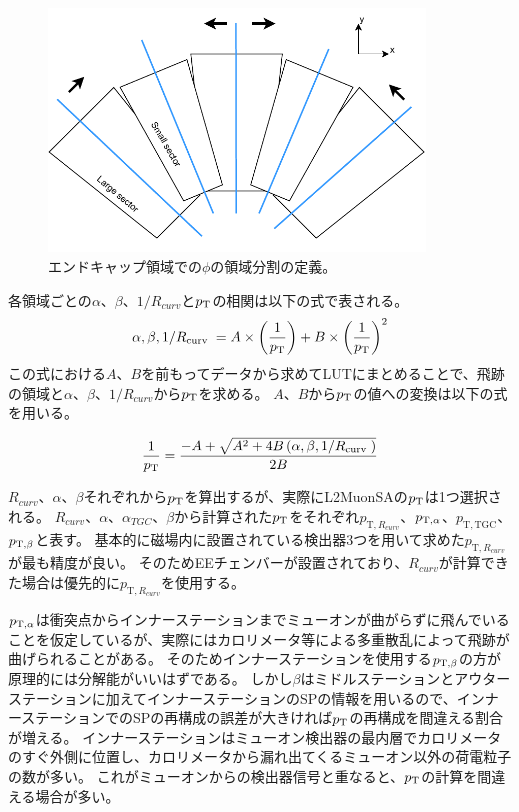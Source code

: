 \begin{figure}[h]
  \centering
  \includegraphics[clip, width=10cm]{fig/3/LUT_binning.pdf}
  \caption{エンドキャップ領域での$\phi$の領域分割の定義。}
  \label{fig:3-10}
\end{figure}

各領域ごとの$\alpha$、$\beta$、$1/R_{curv}$と$p_\mathrm{T}$の相関は以下の式で表される。
\begin{equation}
    \alpha, \beta, 1 / R_{\text {curv }}=A \times\left(\frac{1}{p_\mathrm{T}}\right)+B \times\left(\frac{1}{p_\mathrm{T}}\right)^2
\end{equation}
この式における$A$、$B$を前もってデータから求めてLUTにまとめることで、飛跡の領域と$\alpha$、$\beta$、$1/R_{curv}$から$p_\mathrm{T}$を求める。
$A$、$B$から$p_\mathrm{T}$の値への変換は以下の式を用いる。

\begin{equation}
    \frac{1}{p_\mathrm{T}}=\frac{-A+\sqrt{A^2+4 B\left(\alpha, \beta, 1 / R_{\text {curv }}\right)}}{2 B}
\end{equation}

$R_{curv}$、$\alpha$、$\beta$それぞれから$p_\mathrm{T}$を算出するが、実際にL2MuonSAの$p_\mathrm{T}$は1つ選択される。
$R_{curv}$、$\alpha$、$\alpha_{TGC}$、$\beta$から計算された$p_\mathrm{T}$をそれぞれ$p_{\mathrm{T},R_{curv}}$、$p_{\mathrm{T}, \alpha}$、$p_{\mathrm{T,TGC}}$、$p_{\mathrm{T}, \beta}$と表す。
基本的に磁場内に設置されている検出器3つを用いて求めた$p_{\mathrm{T},R_{curv}}$が最も精度が良い。
そのためEEチェンバーが設置されており、$R_{curv}$が計算できた場合は優先的に$p_{\mathrm{T},R_{curv}}$を使用する。

$p_{\mathrm{T}, \alpha}$は衝突点からインナーステーションまでミューオンが曲がらずに飛んでいることを仮定しているが、実際にはカロリメータ等による多重散乱によって飛跡が曲げられることがある。
そのためインナーステーションを使用する$p_{\mathrm{T}, \beta}$の方が原理的には分解能がいいはずである。
しかし$\beta$はミドルステーションとアウターステーションに加えてインナーステーションのSPの情報を用いるので、インナーステーションでのSPの再構成の誤差が大きければ$p_\mathrm{T}$の再構成を間違える割合が増える。
インナーステーションはミューオン検出器の最内層でカロリメータのすぐ外側に位置し、カロリメータから漏れ出てくるミューオン以外の荷電粒子の数が多い。
これがミューオンからの検出器信号と重なると、$p_\mathrm{T}$の計算を間違える場合が多い。

